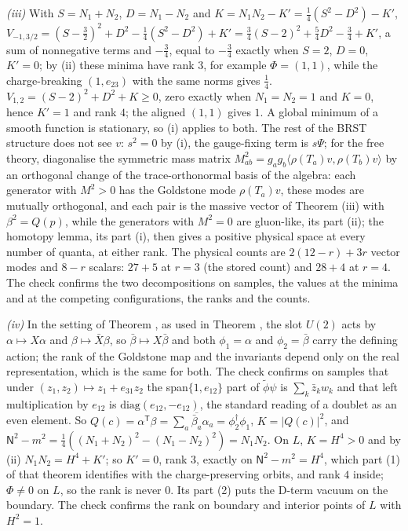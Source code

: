 \emph{(iii)} With $S = N_{1} + N_{2}$, $D = N_{1} - N_{2}$ and $K = N_{1}N_{2} - K' = \tfrac14(S^{2} - D^{2}) - K'$, $V_{-1, 3/2} = (S - \tfrac32)^{2} + D^{2} - \tfrac14(S^{2} - D^{2}) + K' = \tfrac34(S - 2)^{2} + \tfrac54D^{2} - \tfrac34 + K'$, a sum of nonnegative terms and $-\tfrac34$, equal to $-\tfrac34$ exactly when $S = 2$, $D = 0$, $K' = 0$; by (ii) these minima have rank $3$, for example $\Phi = (1, 1)$, while the charge-breaking $(1, e_{23})$ with the same norms gives $\tfrac14$. $V_{1, 2} = (S - 2)^{2} + D^{2} + K \ge 0$, zero exactly when $N_{1} = N_{2} = 1$ and $K = 0$, hence $K' = 1$ and rank $4$; the aligned $(1, 1)$ gives $1$. A global minimum of a smooth function is stationary, so (i) applies to both. The rest of the BRST structure does not see $v$: $s^{2} = 0$ by (i), the gauge-fixing term is $s\Psi$; for the free theory, diagonalise the symmetric mass matrix $M^{2}_{ab} = g_{a}g_{b}\langle\rho(T_{a})v, \rho(T_{b})v\rangle$ by an orthogonal change of the trace-orthonormal basis of the algebra: each generator with $M^{2} > 0$ has the Goldstone mode $\rho(T_{a})v$, these modes are mutually orthogonal, and each pair is the massive vector of Theorem (iii) with $\beta^{2} = Q(p)$, while the generators with $M^{2} = 0$ are gluon-like, its part (ii); the homotopy lemma, its part (i), then gives a positive physical space at every number of quanta, at either rank. The physical counts are $2(12 - r) + 3r$ vector modes and $8 - r$ scalars: $27 + 5$ at $r = 3$ (the stored count) and $28 + 4$ at $r = 4$. The check confirms the two decompositions on samples, the values at the minima and at the competing configurations, the ranks and the counts.

\emph{(iv)} In the setting of Theorem , as used in Theorem , the slot $U(2)$ acts by $\alpha \mapsto X\alpha$ and $\beta \mapsto \bar{X}\beta$, so $\bar{\beta} \mapsto X\bar{\beta}$ and both $\phi_{1} = \alpha$ and $\phi_{2} = \bar{\beta}$ carry the defining action; the rank of the Goldstone map and the invariants depend only on the real representation, which is the same for both. The check confirms on samples that under $(z_{1}, z_{2}) \mapsto z_{1} + e_{31}z_{2}$ the span$\{1, e_{12}\}$ part of $\widetilde{\phi}\psi$ is $\sum_{k}\bar{z}_{k}w_{k}$ and that left multiplication by $e_{12}$ is $\mathrm{diag}(e_{12}, -e_{12})$, the standard reading of a doublet as an even element. So $Q(c) = \alpha^{\mathsf T}\beta = \sum_{a}\overline{\bar{\beta}_{a}}\alpha_{a} = \phi_{2}^{\dagger}\phi_{1}$, $K = |Q(c)|^{2}$, and $\mathsf{N}^{2} - m^{2} = \tfrac14((N_{1} + N_{2})^{2} - (N_{1} - N_{2})^{2}) = N_{1}N_{2}$. On $L$, $K = H^{4} > 0$ and by (ii) $N_{1}N_{2} = H^{4} + K'$; so $K' = 0$, rank $3$, exactly on $\mathsf{N}^{2} - m^{2} = H^{4}$, which part (1) of that theorem identifies with the charge-preserving orbits, and rank $4$ inside; $\Phi \ne 0$ on $L$, so the rank is never $0$. Its part (2) puts the D-term vacuum on the boundary. The check confirms the rank on boundary and interior points of $L$ with $H^{2} = 1$.
